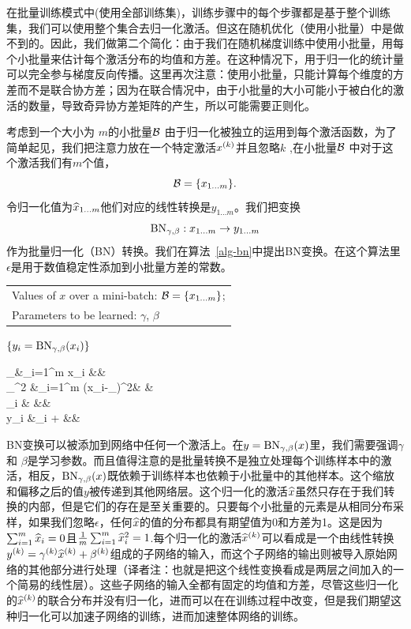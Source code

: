 \documentclass[twocolumn]{article}
\begin{document}
在批量训练模式中(使用全部训练集)，训练步骤中的每个步骤都是基于整个训练集，我们可以使用整个集合去归一化激活。但这在随机优化（使用小批量）中是做不到的。因此，我们做第二个简化：由于我们在随机梯度训练中使用小批量，用每个小批量来估计每个激活分布的均值和方差。在这种情况下，用于归一化的统计量可以完全参与梯度反向传播。这里再次注意：使用小批量，只能计算每个维度的方差而不是联合协方差；因为在联合情况中，由于小批量的大小可能小于被白化的激活的数量，导致奇异协方差矩阵的产生，所以可能需要正则化。

考虑到一个大小为 $m$的小批量$\setB$ 由于归一化被独立的运用到每个激活函数，为了简单起见，我们把注意力放在一个特定激活$x^\kk$并且忽略$k$ ,在小批量$\setB$ 中对于这个激活我们有$m$个值，$$\setB=\{x_{1\ldots m}\}.$$令归一化值为$\xhat_{1\ldots m}$他们对应的线性转换是$y_{1\ldots m}$。我们把变换$$\BatchNorm_{\gamma,\beta}: x_{1\ldots m}\rightarrow y_{1\ldots m}$$作为批量归一化（BN）转换。我们在算法~\ref{alg-bn}中提出BN变换。在这个算法里$\epsilon$是用于数值稳定性添加到小批量方差的常数。

\begin{algorithm}
  \caption{BN变换，应用于小批量上的激活函数\mbox{activation $x$} }
\label{alg-bn}
  \begin{algorithmic}
  \REQUIRE 
  \begin{tabular}[t]{@{}l}Values of   $x$ over a mini-batch:
  $\setB=\{x_{1\ldots m}\}$;\\ 
 Parameters to be learned: $\gamma$,
    $\beta$ \end{tabular}
  \ENSURE $\{y_i =  \BN{x_i}{\gamma,\beta}\}$
  \begin{flalign*}
      \mu_\setB &\leftarrow {}\sum_{i=1}^m x_i &&\\
  \sigma_\setB^2 &\leftarrow {}\sum_{i=1}^m (x_i-\mu_\setB)^2& &\\
\xhat_i &\leftarrow {}   
&&\\
  y_i &\leftarrow \gamma\xhat_i + \beta  
  \equiv{}
    &&
  \end{flalign*}
\end{algorithmic}
\end{algorithm}

BN变换可以被添加到网络中任何一个激活上。在$y = \BN{x}{\gamma,\beta}$里，我们需要强调$\gamma$ 和 $\beta$是学习参数。而且值得注意的是批量转换不是独立处理每个训练样本中的激活，相反，$\BN{x}{\gamma,\beta}$既依赖于训练样本也依赖于小批量中的其他样本。这个缩放和偏移之后的值$y$被传递到其他网络层。这个归一化的激活$\xhat$虽然只存在于我们转换的内部，但是它们的存在是至关重要的。只要每个小批量的元素是从相同分布采样，如果我们忽略$\epsilon$，任何$\xhat$的值的分布都具有期望值为0和方差为1。这是因为$\sum_{i=1}^m \xhat_i = 0$且$\frac{1}{m}\sum_{i=1}^m \xhat_i^2 = 1$.每个归一化的激活$\xhat^\kk$可以看成是一个由线性转换$y^\kk=\gamma^\kk\xhat^\kk+\beta^\kk$组成的子网络的输入，而这个子网络的输出则被导入原始网络的其他部分进行处理（译者注：也就是把这个线性变换看成是两层之间加入的一个简易的线性层）。这些子网络的输入全都有固定的均值和方差，尽管这些归一化的$\xhat^\kk$的联合分布并没有归一化，进而可以在在训练过程中改变，但是我们期望这种归一化可以加速子网络的训练，进而加速整体网络的训练。
\end{document}
